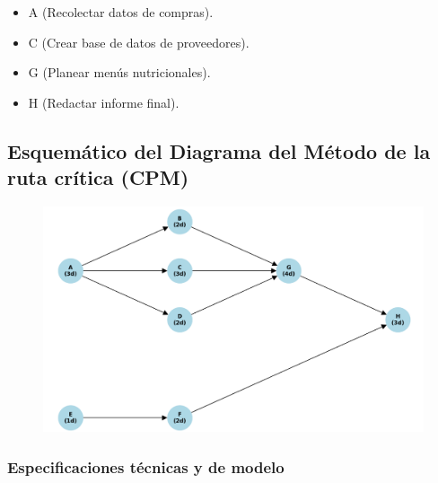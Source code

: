 \documentclass[letterpaper, 11pt]{report}
\begin{document}
\begin{itemize}
      \item A (Recolectar datos de compras).
      \item C (Crear base de datos de proveedores).
      \item G (Planear menús nutricionales).
      \item H (Redactar informe final).
\end{itemize}

\subsection{Esquemático del Diagrama del Método de la ruta crítica (CPM)}

\begin{figure}[H]
      \begin{center}
            \includegraphics[width=\linewidth]{./Images/diagrama_idk.png}
            \caption{}
      \end{center}
\end{figure}

\subsubsection{Especificaciones técnicas y de modelo}
\end{document}
